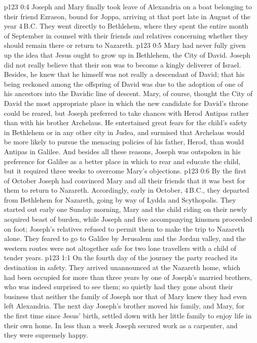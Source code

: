 \vs p123 0:4 \pc Joseph and Mary finally took leave of Alexandria on a boat belonging to their friend Ezraeon, bound for Joppa, arriving at that port late in August of the year 4\,B.C. They went directly to Bethlehem, where they spent the entire month of September in counsel with their friends and relatives concerning whether they should remain there or return to Nazareth.
\vs p123 0:5 Mary had never fully given up the idea that Jesus ought to grow up in Bethlehem, the City of David. Joseph did not really believe that their son was to become a kingly deliverer of Israel. Besides, he knew that he himself was not really a descendant of David; that his being reckoned among the offspring of David was due to the adoption of one of his ancestors into the Davidic line of descent. Mary, of course, thought the City of David the most appropriate place in which the new candidate for David’s throne could be reared, but Joseph preferred to take chances with Herod Antipas rather than with his brother Archelaus. He entertained great fears for the child’s safety in Bethlehem or in any other city in Judea, and surmised that Archelaus would be more likely to pursue the menacing policies of his father, Herod, than would Antipas in Galilee. And besides all these reasons, Joseph was outspoken in his preference for Galilee as a better place in which to rear and educate the child, but it required three weeks to overcome Mary’s objections.
\vs p123 0:6 By the first of October Joseph had convinced Mary and all their friends that it was best for them to return to Nazareth. Accordingly, early in October, 4\,B.C., they departed from Bethlehem for Nazareth, going by way of Lydda and Scythopolis. They started out early one Sunday morning, Mary and the child riding on their newly acquired beast of burden, while Joseph and five accompanying kinsmen proceeded on foot; Joseph’s relatives refused to permit them to make the trip to Nazareth alone. They feared to go to Galilee by Jerusalem and the Jordan valley, and the western routes were not altogether safe for two lone travellers with a child of tender years.
\vs p123 1:1 On the fourth day of the journey the party reached its destination in safety. They arrived unannounced at the Nazareth home, which had been occupied for more than three years by one of Joseph’s married brothers, who was indeed surprised to see them; so quietly had they gone about their business that neither the family of Joseph nor that of Mary knew they had even left Alexandria. The next day Joseph’s brother moved his family, and Mary, for the first time since Jesus’ birth, settled down with her little family to enjoy life in their own home. In less than a week Joseph secured work as a carpenter, and they were supremely happy.
